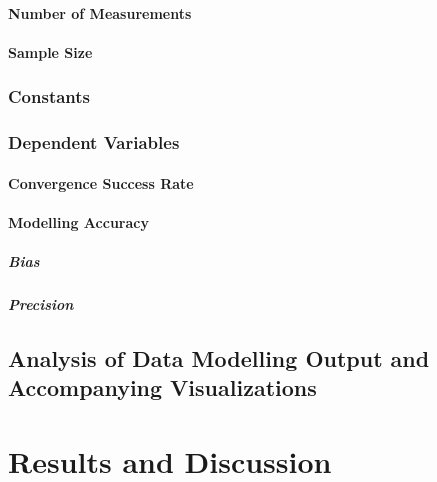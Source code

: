 \documentclass[
12pt, %
twoside,
english]{guelphthesis}
\begin{document}
\hypertarget{number-of-measurements-1}{%
\paragraph{Number of Measurements}\label{number-of-measurements-1}}

\hypertarget{sample-size}{%
\paragraph{Sample Size}\label{sample-size}}

\hypertarget{constants-exp2}{%
\subsubsection{Constants}\label{constants-exp2}}

\hypertarget{dependent-variables-1}{%
\subsubsection{Dependent Variables}\label{dependent-variables-1}}

\hypertarget{convergence-success-rate}{%
\paragraph{Convergence Success Rate}\label{convergence-success-rate}}

\hypertarget{modelling-accuracy-1}{%
\paragraph{Modelling Accuracy}\label{modelling-accuracy-1}}

\hypertarget{bias-comp}{%
\subparagraph{Bias}\label{bias-comp}}

\hypertarget{pres-precision}{%
\subparagraph{Precision}\label{pres-precision}}

\hypertarget{analysis-of-data-modelling-output-and-accompanying-visualizations}{%
\subsection{Analysis of Data Modelling Output and Accompanying Visualizations}\label{analysis-of-data-modelling-output-and-accompanying-visualizations}}

\hypertarget{results-and-discussion-1}{%
\section{Results and Discussion}\label{results-and-discussion-1}}
\end{document}
